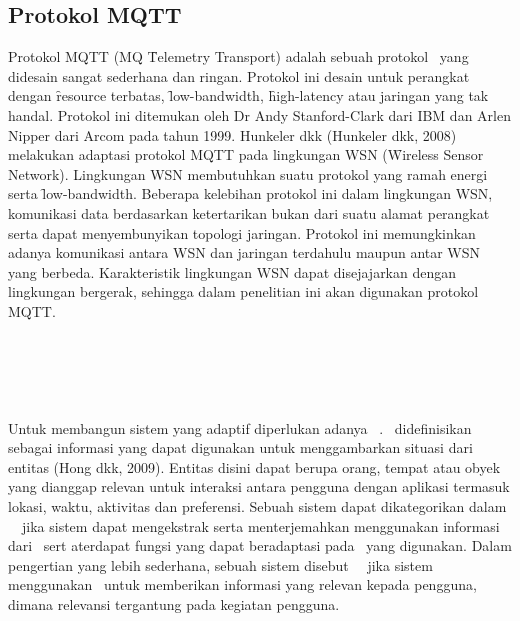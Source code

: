 \subsection{Protokol MQTT}

Protokol MQTT (MQ \f{Telemetry Transport}) adalah sebuah protokol \pubsub~yang
didesain sangat sederhana dan ringan. Protokol ini desain untuk perangkat
dengan \f{resource} terbatas, \f{low-bandwidth}, \f{high-latency} atau jaringan
yang tak handal. Protokol ini ditemukan oleh Dr Andy Stanford-Clark dari IBM
dan Arlen Nipper dari Arcom pada tahun 1999. Hunkeler dkk (Hunkeler dkk, 2008)
melakukan adaptasi protokol MQTT pada lingkungan WSN (\f{Wireless Sensor
Network}). Lingkungan WSN membutuhkan suatu protokol yang ramah energi serta
\f{low-bandwidth}. Beberapa kelebihan protokol ini dalam lingkungan WSN,
komunikasi data berdasarkan ketertarikan bukan dari suatu alamat perangkat
serta dapat menyembunyikan topologi jaringan. Protokol ini memungkinkan adanya
komunikasi antara WSN dan jaringan terdahulu maupun antar WSN yang berbeda.
Karakteristik lingkungan WSN dapat disejajarkan dengan lingkungan bergerak,
sehingga dalam penelitian ini akan digunakan protokol MQTT.


\section{\Context~\Aware}

Untuk membangun sistem yang adaptif diperlukan adanya \context~\aware.
\Context~didefinisikan sebagai informasi yang dapat digunakan untuk
menggambarkan situasi dari entitas (Hong dkk, 2009). Entitas disini dapat
berupa orang, tempat atau obyek yang dianggap relevan untuk interaksi antara
pengguna dengan aplikasi termasuk lokasi, waktu, aktivitas dan preferensi.
Sebuah sistem dapat dikategorikan dalam \context~\aware~jika sistem dapat
mengekstrak serta menterjemahkan menggunakan informasi dari \context~sert
aterdapat fungsi yang dapat beradaptasi pada \context~yang digunakan. Dalam
pengertian yang lebih sederhana, sebuah sistem disebut \context~\aware~jika
sistem menggunakan \context~untuk memberikan informasi yang relevan kepada
pengguna, dimana relevansi tergantung pada kegiatan pengguna.

